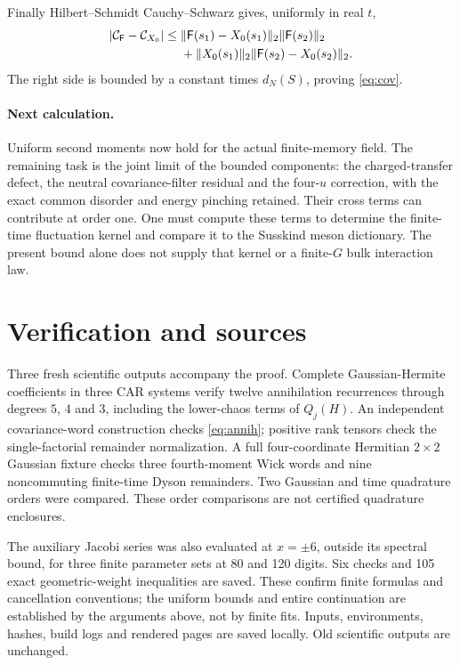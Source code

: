 \documentclass[11pt,a4paper]{article}
\newcommand{\FF}{\mathsf F}
\begin{document}
Finally Hilbert--Schmidt Cauchy--Schwarz gives, uniformly in real $t$,
\begin{align}
 |\mathcal C_{\FF}-\mathcal C_{X_0}|
 \le{}&\|\FF(s_1)-X_0(s_1)\|_2\|\FF(s_2)\|_2\notag\\
 &+\|X_0(s_1)\|_2\|\FF(s_2)-X_0(s_2)\|_2.
\end{align}
The right side is bounded by a constant times $d_N(S)$, proving
\eqref{eq:cov}.

\paragraph{Next calculation.}
Uniform second moments now hold for the actual finite-memory field.
The remaining task is the joint limit of the bounded components:
the charged-transfer defect, the neutral covariance-filter residual
and the four-$u$ correction, with the exact common disorder and
energy pinching retained. Their cross terms can contribute at order
one. One must compute these terms to determine the finite-time
fluctuation kernel and compare it to the Susskind meson dictionary.
The present bound alone does not supply that kernel or a finite-$G$
bulk interaction law.

\newpage
\section{Verification and sources}
Three fresh scientific outputs accompany the proof. Complete
Gaussian-Hermite coefficients in three CAR systems verify twelve
annihilation recurrences through degrees $5$, $4$ and $3$, including
the lower-chaos terms of $Q_j(H)$. An independent covariance-word
construction checks \eqref{eq:annih}; positive rank tensors check
the single-factorial remainder normalization. A full four-coordinate
Hermitian $2\times2$ Gaussian fixture checks three fourth-moment
Wick words and nine noncommuting finite-time Dyson remainders.
Two Gaussian and time quadrature orders were compared. These
order comparisons are not certified quadrature enclosures.

The auxiliary Jacobi series was also evaluated at $x=\pm6$, outside
its spectral bound, for three finite parameter sets at 80 and 120
digits. Six checks and 105 exact geometric-weight inequalities are
saved. These confirm finite formulas and cancellation conventions;
the uniform bounds and entire continuation are established by the
arguments above, not by finite fits. Inputs, environments, hashes,
build logs and rendered pages are saved locally. Old scientific
outputs are unchanged.
\end{document}
